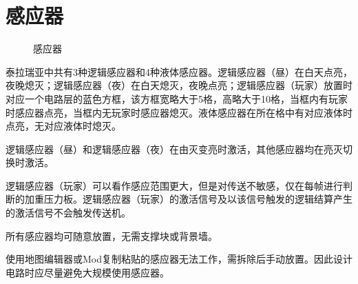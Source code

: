 \section{感应器}
\begin{figure}[!ht]
\centering
{}
\qquad
{}
\qquad
{}
\caption{感应器}
\end{figure}
泰拉瑞亚中共有3种逻辑感应器和4种液体感应器。逻辑感应器（昼）在白天点亮，夜晚熄灭；逻辑感应器（夜）在白天熄灭，夜晚点亮；逻辑感应器（玩家）放置时对应一个电路层的蓝色方框，该方框宽略大于5格，高略大于10格，当框内有玩家时感应器点亮，当框内无玩家时感应器熄灭。液体感应器在所在格中有对应液体时点亮，无对应液体时熄灭。

逻辑感应器（昼）和逻辑感应器（夜）在由灭变亮时激活，其他感应器均在亮灭切换时激活。

逻辑感应器（玩家）可以看作感应范围更大，但是对传送不敏感，仅在每帧进行判断的加重压力板。逻辑感应器（玩家）的激活信号及以该信号触发的逻辑结算产生的激活信号不会触发传送机。

所有感应器均可随意放置，无需支撑块或背景墙。

使用地图编辑器或Mod复制粘贴的感应器无法工作，需拆除后手动放置。因此设计电路时应尽量避免大规模使用感应器。

